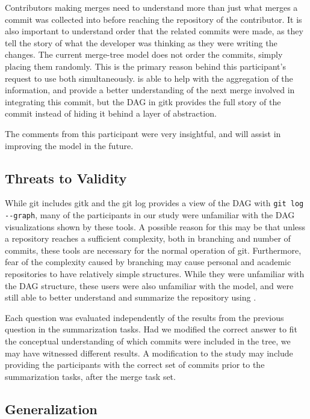 \documentclass[draft]{IEEEtran}
\begin{document}
Contributors making merges need to understand more than just what merges
a commit was collected into before reaching the repository of the
contributor. It is also important to understand order that the related
commits were made, as they tell the story of what the developer was
thinking as they were writing the changes. The current merge-tree model
does not order the commits, simply placing them randomly. This is the
primary reason behind this participant's request to use both
simultaneously. \tool is able to help with the aggregation of the
information, and provide a better understanding of the next merge
involved in integrating this commit, but the DAG in gitk provides the
full story of the commit instead of hiding it behind a layer of
abstraction.

The comments from this participant were very insightful, and will assist
in improving the model in the future.

\subsection{Threats to Validity}
\label{sub:threats}

While git includes gitk and the git log provides a view of the DAG with
\verb|git log --graph|, many of the participants in our study were
unfamiliar with the DAG visualizations shown by these tools. A possible
reason for this may be that unless a repository reaches a sufficient
complexity, both in branching and number of commits, these tools are
necessary for the normal operation of git. Furthermore, fear of the
complexity caused by branching may cause personal and academic
repositories to have relatively simple structures. While they were
unfamiliar with the DAG structure, these users were also unfamiliar with
the \mt model, and were still able to better understand and summarize
the repository using \tool.

Each question was evaluated independently of the results from the
previous question in the summarization tasks. Had we modified the
correct answer to fit the conceptual understanding of which commits were
included in the tree, we may have witnessed different results. A
modification to the study may include providing the participants with
the correct set of commits prior to the summarization tasks, after the
merge task set.


\subsection{Generalization}
\label{sub:generalization}
\end{document}
